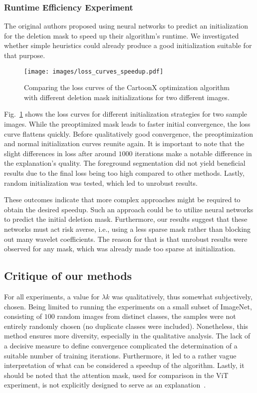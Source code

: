 \subsubsection{Runtime Efficiency Experiment}
The original authors proposed using neural networks to predict an initialization for the deletion mask to speed up their algorithm's runtime.
We investigated whether simple heuristics could already produce a good initialization suitable for that purpose.

\begin{figure}[htb]
    \centering
    \texttt{[image: images/loss\_curves\_speedup.pdf]}
    \caption{Comparing the loss curves of the CartoonX optimization algorithm with different deletion mask initializations for two different images.}
    \label{fig:speed}
\end{figure}

Fig.~\ref{fig:speed} shows the loss curves for different initialization strategies for two sample images.
While the preoptimized mask leads to faster initial convergence, the loss curve flattens quickly.
Before qualitatively good convergence, the preoptimization and normal initialization curves reunite again.
It is important to note that the slight differences in loss after around $1000$ iterations make a notable difference in the explanation's quality.
The foreground segmentation did not yield beneficial results due to the final loss being too high compared to other methods.
Lastly, random initialization was tested, which led to unrobust results.

These outcomes indicate that more complex approaches might be required to obtain the desired speedup. Such an approach could be to utilize neural networks to predict the initial deletion mask. 
Furthermore, our results suggest that these networks must act risk averse, i.e., using a less sparse mask rather than blocking out many wavelet coefficients.
The reason for that is that unrobust results were observed for any mask, which was already made too sparse at initialization.

\subsection{Critique of our methods}
For all experiments, a value for $\lambda k$ was qualitatively, thus somewhat subjectively, chosen.
Being limited to running the experiments on a small subset of ImageNet, consisting of $100$ random images from distinct classes, the samples were not entirely randomly chosen (no duplicate classes were included).
Nonetheless, this method ensures more diversity, especially in the qualitative analysis.
The lack of a decisive measure to define convergence complicated the determination of a suitable number of training iterations.
Furthermore, it led to a rather vague interpretation of what can be considered a speedup of the algorithm.
Lastly, it should be noted that the attention mask, used for comparison in the ViT experiment, is not explicitly designed to serve as an explanation~\cite{jain2019attention_not_explanation}.


